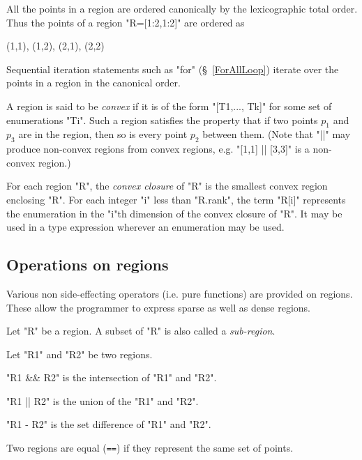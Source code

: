 All the points in a region are ordered canonically by the lexicographic total order. Thus the points of a region \xcd"R=[1:2,1:2]" are ordered as 
\begin{xten}
(1,1), (1,2), (2,1), (2,2)
\end{xten}
Sequential iteration statements such as \xcd"for" (\S~\ref{ForAllLoop})
iterate over the points in a region in the canonical order.

A region is said to be {\em convex} if it is of
the form \xcd"[T1,..., Tk]" for some set of enumerations \xcd"Ti". Such a
region satisfies the property that if two points $p_1$ and $p_3$ are
in the region, then so is every point $p_2$ between them. (Note that
\xcd"||" may produce non-convex regions from convex regions, e.g.{}
\xcd"[1,1] || [3,3]" is a non-convex region.)

For each region \xcd"R", the {\em convex closure} of \xcd"R" is the
smallest convex region enclosing \xcd"R".  For each integer \xcd"i"
less than \xcd"R.rank", the term \xcd"R[i]" represents the enumeration
in the \xcd"i"th dimension of the convex closure of \xcd"R". It may be
used in a type expression wherever an enumeration may be used.

\subsection{Operations on regions}
Various non side-effecting operators (i.e.{} pure functions) are
provided on regions. These allow the programmer to express sparse as
well as dense regions.

Let \xcd"R" be a region. A subset of \xcd"R" is also called a {\em
sub-region}.

Let \xcd"R1" and \xcd"R2" be two regions.

\xcd"R1 && R2" is the intersection of \xcd"R1" and \xcd"R2".

\xcd"R1 || R2" is the union of the \xcd"R1" and \xcd"R2".

\xcd"R1 - R2" is the set difference of \xcd"R1" and \xcd"R2".

Two regions are equal ({\tt ==}) if they represent the same set of
points.










